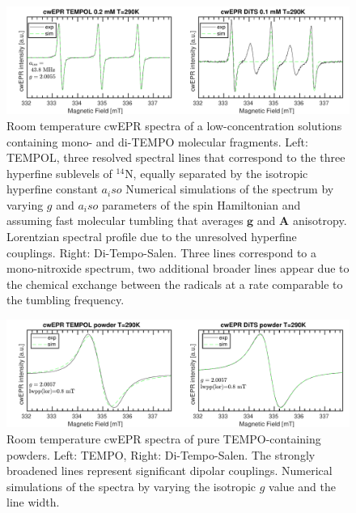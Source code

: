 \begin{figure}[h]
\center
	\includegraphics[width=1\textwidth]{./operando_epr/figures/TEMPOL/cwEPR_TEMPOL_vs_DiTS_RT.pdf}
	\caption{Room temperature cwEPR spectra of a low-concentration solutions containing mono- and di-TEMPO molecular fragments. Left: TEMPOL, three resolved spectral lines that correspond to the three hyperfine sublevels of $^{14}$N, equally separated by the isotropic hyperfine constant $a_iso$ Numerical simulations of the spectrum by varying $g$ and $a_iso$ parameters of the spin Hamiltonian and assuming fast molecular tumbling that averages $\textbf{g}$ and $\textbf{A}$ anisotropy. Lorentzian spectral profile due to the unresolved hyperfine couplings. Right: Di-Tempo-Salen. Three lines correspond to a mono-nitroxide spectrum, two additional broader lines appear due to the chemical exchange between the radicals at a rate comparable to the tumbling frequency.}
	\label{fig:cwEPR_monoTEMPO_diTEMPO_SOLUTION}
\end{figure}
\begin{figure}[h]
\center
	\includegraphics[width=1\textwidth]{./operando_epr/figures/TEMPOL/cwEPR_TEMPOL_vs_DiTS_RT_POWDER.pdf}
	\caption{Room temperature cwEPR spectra of pure TEMPO-containing powders. Left: TEMPO, Right: Di-Tempo-Salen. The strongly broadened lines represent significant dipolar couplings. Numerical simulations of the spectra by varying the isotropic $g$ value and the line width.}
	\label{fig:cwEPR_monoTEMPO_diTEMPO_POWDER}
\end{figure}

